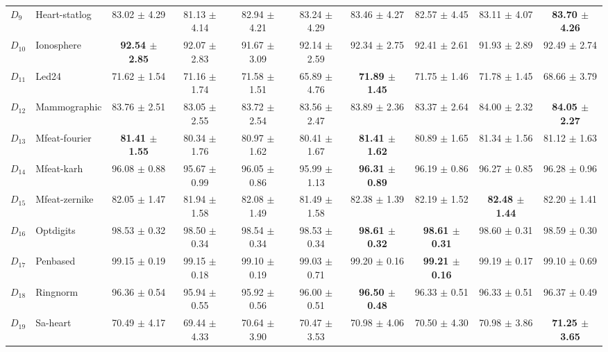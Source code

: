 {\begin{landscape}
\begin{table}[!ht]
\begin{adjustbox}{max width=1.5\textwidth}
\begin{tabular}{llcccc|cccc}
\rule{0pt}{10pt}  $D_{9}$ & Heart-statlog & 83.02 $\pm$ 4.29 & 81.13 $\pm$ 4.14& 82.94 $\pm$ 4.21 &83.24 $\pm$ 4.29&83.46 $\pm$ 4.27& 82.57 $\pm$ 4.45& 83.11 $\pm$ 4.07&\textbf{83.70 $\pm$ 4.26}\\ 
\rule{0pt}{10pt}  $D_{10}$ & Ionosphere & \textbf{92.54 $\pm$ 2.85}& 92.07 $\pm$ 2.83& 91.67 $\pm$ 3.09 &92.14 $\pm$ 2.59& 92.34 $\pm$ 2.75& 92.41 $\pm$ 2.61& 91.93 $\pm$ 2.89&92.49 $\pm$ 2.74\\ 
\rule{0pt}{10pt}  $D_{11}$ & Led24 & 71.62 $\pm$ 1.54& 71.16 $\pm$ 1.74& 71.58 $\pm$ 1.51&65.89 $\pm$ 4.76& \textbf{71.89 $\pm$ 1.45}& 71.75 $\pm$ 1.46& 71.78 $\pm$ 1.45&68.66 $\pm$ 3.79\\ 
\rule{0pt}{10pt}  $D_{12}$ & Mammographic & 83.76 $\pm$ 2.51& 83.05 $\pm$ 2.55& 83.72 $\pm$ 2.54 &83.56 $\pm$ 2.47& 83.89 $\pm$ 2.36& 83.37 $\pm$ 2.64&84.00 $\pm$ 2.32&\textbf{84.05 $\pm$ 2.27}\\  
\rule{0pt}{10pt}  $D_{13}$ & Mfeat-fourier & \textbf{81.41 $\pm$ 1.55}& 80.34 $\pm$ 1.76& 80.97 $\pm$ 1.62&80.41 $\pm$ 1.67& \textbf{81.41 $\pm$ 1.62}& 80.89 $\pm$ 1.65& 81.34 $\pm$ 1.56&81.12 $\pm$ 1.63\\ 
\rule{0pt}{10pt}  $D_{14}$ & Mfeat-karh &96.08 $\pm$ 0.88& 95.67 $\pm$ 0.99& 96.05 $\pm$ 0.86 &95.99 $\pm$ 1.13&\textbf{96.31 $\pm$ 0.89}& 96.19 $\pm$ 0.86& 96.27 $\pm$ 0.85&96.28 $\pm$ 0.96\\ 
\rule{0pt}{10pt}  $D_{15}$ & Mfeat-zernike & 82.05 $\pm$ 1.47& 81.94 $\pm$ 1.58&82.08 $\pm$ 1.49 &81.49 $\pm$ 1.58& 82.38 $\pm$ 1.39& 82.19 $\pm$ 1.52& \textbf{82.48 $\pm$ 1.44}&82.20 $\pm$ 1.41\\ 
\rule{0pt}{10pt}  $D_{16}$ & Optdigits & 98.53 $\pm$ 0.32& 98.50 $\pm$ 0.34& 98.54 $\pm$ 0.34 &98.53 $\pm$ 0.34&\textbf{ 98.61 $\pm$ 0.32}& \textbf{98.61 $\pm$ 0.31}& 98.60 $\pm$ 0.31&98.59 $\pm$ 0.30\\ 
\rule{0pt}{10pt}  $D_{17}$ & Penbased & 99.15 $\pm$ 0.19& 99.15 $\pm$ 0.18& 99.10 $\pm$ 0.19 &99.03 $\pm$ 0.71& 99.20 $\pm$ 0.16& \textbf{99.21 $\pm$ 0.16}& 99.19 $\pm$ 0.17&99.10 $\pm$ 0.69\\ 
\rule{0pt}{10pt}  $D_{18}$ & Ringnorm & 96.36 $\pm$ 0.54& 95.94 $\pm$ 0.55& 95.92 $\pm$ 0.56 &96.00 $\pm$ 0.51& \textbf{96.50 $\pm$ 0.48}& 96.33 $\pm$ 0.51& 96.33 $\pm$ 0.51&96.37 $\pm$ 0.49\\ 
 \rule{0pt}{10pt} $D_{19}$ & Sa-heart &70.49 $\pm$ 4.17& 69.44 $\pm$ 4.33& 70.64 $\pm$ 3.90 &70.47 $\pm$ 3.53& 70.98 $\pm$ 4.06& 70.50 $\pm$ 4.30& 70.98 $\pm$ 3.86&\textbf{71.25 $\pm$ 3.65}\\ 

\end{tabular}
\end{adjustbox}
\end{table}
\end{landscape}}
